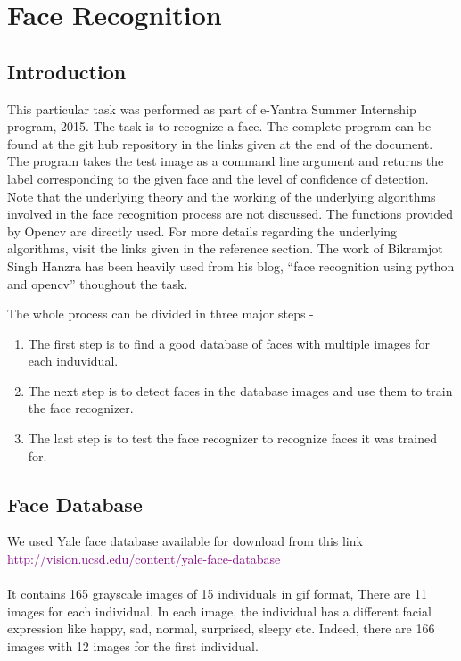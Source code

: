 \documentclass[a4paper,12pt]{article}
\begin{document}
\newpage
\section{Face Recognition}
\subsection{Introduction}
This particular task was performed as part of e-Yantra Summer Internship program, 2015. The task is to recognize a face. 
The complete program can be found at the git hub repository in the links given at the end of the document. The program takes 
the test image as a command line argument and returns the label corresponding to the given face and the level of confidence of 
detection. Note that the underlying theory and the working of the underlying algorithms involved in the face recognition process 
are not discussed. The functions provided by Opencv are directly used. For more details regarding the underlying algorithms, 
visit the links given in the reference section. The work of Bikramjot Singh Hanzra has been heavily used from his blog, 
“face recognition using python and opencv” thoughout the task. 

The whole process can be divided in three major steps -
\begin{enumerate}
 \item The first step is to find a good database of faces with multiple images for each induvidual. 
 \item The next step is to detect faces in the database images and use them to train the face recognizer. 
 \item The last step is to test the face recognizer to recognize faces it was trained for.
\end{enumerate}

\subsection{Face Database}
We used Yale face database available for download from this link
\\
\newline \textcolor{purple}{http://vision.ucsd.edu/content/yale-face-database}
\\
\\
It contains 165 grayscale images of 15 individuals in gif format, There are 11 images for each individual.
In each image, the individual has a different facial expression like happy, sad, normal, surprised, sleepy etc.
Indeed, there are 166 images with 12 images for the first individual.
\end{document}
